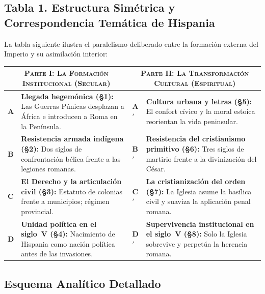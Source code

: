 \documentclass[11pt,letterpaper]{article}
\begin{document}
\vspace{0.2em}

\subsection*{Tabla 1. Estructura Simétrica y Correspondencia Temática de Hispania}

\noindent La tabla siguiente ilustra el paralelismo deliberado entre la formación externa del Imperio y su asimilación interior:

\begin{center}
\footnotesize
\begin{tabularx}{\linewidth}{@{}l X l X@{}}
  \toprule
  \multicolumn{2}{c}{\textbf{\textsc{Parte I: La Formación Institucional (Secular)}}} & 
  \multicolumn{2}{c}{\textbf{\textsc{Parte II: La Transformación Cultural (Espiritual)}}} \\
  \midrule
  \textbf{A} & \textbf{Llegada hegemónica (§1):} Las Guerras Púnicas desplazan a África e introducen a Roma en la Península. &
  \textbf{A$'$} & \textbf{Cultura urbana y letras (§5):} El confort cívico y la moral estoica reorientan la vida peninsular. \\
  \addlinespace[0.4em]
  \textbf{B} & \textbf{Resistencia armada indígena (§2):} Dos siglos de confrontación bélica frente a las legiones romanas. &
  \textbf{B$'$} & \textbf{Resistencia del cristianismo primitivo (§6):} Tres siglos de martirio frente a la divinización del César. \\
  \addlinespace[0.4em]
  \textbf{C} & \textbf{El Derecho y la articulación civil (§3):} Estatuto de colonias frente a municipios; régimen provincial. &
  \textbf{C$'$} & \textbf{La cristianización del orden (§7):} La Iglesia asume la basílica civil y suaviza la aplicación penal romana. \\
  \addlinespace[0.4em]
  \textbf{D} & \textbf{Unidad política en el siglo~V (§4):} Nacimiento de Hispania como nación política antes de las invasiones. &
  \textbf{D$'$} & \textbf{Supervivencia institucional en el siglo~V (§8):} Solo la Iglesia sobrevive y perpetúa la herencia romana. \\
  \bottomrule
\end{tabularx}
\end{center}

\vspace{0.4em}

\subsection*{Esquema Analítico Detallado}
\end{document}
